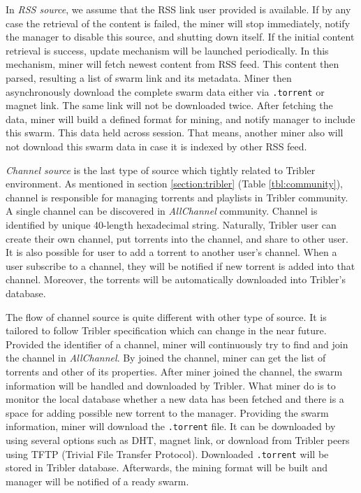 In \textit{RSS source}, we assume that the RSS link user provided is available. If by any case the retrieval of the content is failed, the miner will stop immediately, notify the manager to disable this source, and shutting down itself. If the initial content retrieval is success, update mechanism will be launched periodically. In this mechanism, miner will fetch newest content from RSS feed. This content then parsed, resulting a list of swarm link and its metadata. Miner then asynchronously download the complete swarm data either via \texttt{.torrent} or magnet link. The same link will not be downloaded twice. After fetching the data, miner will build a defined format for mining, and notify manager to include this swarm. This data held across session. That means, another miner also will not download this swarm data in case it is indexed by other RSS feed.

\textit{Channel source} is the last type of source which tightly related to Tribler environment. As mentioned in section \ref{section:tribler} (Table \ref{tbl:community}), channel is responsible for managing torrents and playlists in Tribler community. A single channel can be discovered in \textit{AllChannel} community. Channel is identified by unique 40-length hexadecimal string. Naturally, Tribler user can create their own channel, put torrents into the channel, and share to other user. It is also possible for user to add a torrent to another user's channel. When a user subscribe to a channel, they will be notified if new torrent is added into that channel. Moreover, the torrents will be automatically downloaded into Tribler's database.

The flow of channel source is quite different with other type of source. It is tailored to follow Tribler specification which can change in the near future. Provided the identifier of a channel, miner will continuously try to find and join the channel in \textit{AllChannel}. By joined the channel, miner can get the list of torrents and other of its properties. After miner joined the channel, the swarm information will be handled and downloaded by Tribler. What miner do is to monitor the local database whether a new data has been fetched and there is a space for adding possible new torrent to the manager. Providing the swarm information, miner will download the \texttt{.torrent} file. It can be downloaded by using several options such as DHT, magnet link, or download from Tribler peers using TFTP (Trivial File Transfer Protocol). Downloaded \texttt{.torrent} will be stored in Tribler database. Afterwards, the mining format will be built and manager will be notified of a ready swarm.  

